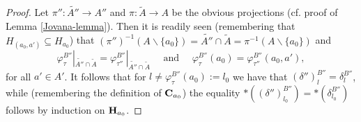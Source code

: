 \documentclass[11pt]{article}
\theoremstyle{definition}
\numberwithin{equation}{section}
\numberwithin{equation}{section}
\newcommand{\inc}{\subseteq}
\newcommand{\set}[1]{\{#1\}}
\newcommand{\hyper}[1]{{\bf #1}}
\begin{document}
\begin{proof}
Let $\pi'':\widetilde{A''}\rightarrow A''$ and $\pi:\tilde{A}\rightarrow A$ be the obvious projections (cf. proof of Lemma \ref{Jovana-lemma}). Then it is readily seen (remembering that $H_{(a_0,a')}\inc H_{a_0}$) that $(\pi'')^{-1}(A\backslash\set{a_0})= \widetilde{A''} \cap \tilde{A}= \pi^{-1}(A\backslash\set{a_0})$ and
\begin{equation}
\label{phi-phi-case1}
\varphi_\tau^{B''}|_{\widetilde{A''} \cap \tilde{A}}=\varphi_{\tau''}^{B''}|_{\widetilde{A''} \cap \tilde{A}}\quad \mbox{ and }\quad
\varphi_{\tau}^{B''}\!(a_0)=\varphi_{\tau''}^{B''}(a_0,a'), 
\end{equation}
for all $a'\in A'$. It follows that  for $l\neq \varphi_{\tau}^{B''}(a_0):=l_0$ we have that $(\delta'')^{B''}_l=\delta^{B''}_l$, while (remembering the definition of ${\bf C}_{a_0}$) the equality
$\ast((\delta'')^{B''}_{l_0})=\ast(\delta^{B''}_{l_0})$ follows by induction on $\hyper{H}_{a_0}$.


\end{proof}
\end{document}
